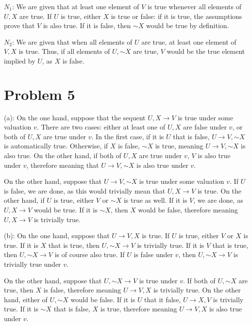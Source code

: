 \documentclass{article}
\newcommand*{\oldneg}{\mathord{\sim}}
\theoremstyle{definition}
\begin{document}
$N_1$: We are given that at least one element of $V$ is true whenever all elements of $U,X$ are true. If $U$ is true, either $X$ is true or false: if it is true, the assumptions
prove that $V$ is also true. If it is false, then $\oldneg X$ would be true by definition.


$N_2$: We are given that when all elements of $U$ are true, at least one element of $V,X$ is true. Thus, if all elements of $U,\oldneg X$ are true, $V$ would be the true element
implied by $U$, as $X$ is false.

\section*{Problem 5}


(a): On the one hand, suppose that the sequent $U,X\rightarrow V$ is true under some valuation $v$. There are two cases: either at least one of $U,X$ are false under $v$, 
or both of $U,X$ are true under $v$. In the first case, if it is $U$ that is false, $U\rightarrow V,\oldneg X$ is automatically true. Otherwise, if $X$ is false, 
$\oldneg X$ is true, meaning $U\rightarrow V,\oldneg X$ is also true. On the other hand, if both of $U,X$ are true under $v$, $V$ is also true under $v$, therefore meaning 
that $U\rightarrow V,\oldneg X$ is also true under $v$.


On the other hand, suppose that $U\rightarrow V,\oldneg X$ is true under some valuation $v$. If $U$ is false, we are done, as this would trivially mean that 
$U,X\rightarrow V$ is true. On the other hand, if $U$ is true, either $V$ or $\oldneg X$ is true as well. If it is $V$, we are done, as 
$U,X\rightarrow V$ would be true. If it is $\oldneg X$, then $X$ would be false, therefore meaning $U,X\rightarrow V$ is trivially true.


(b): On the one hand, suppose that $U\rightarrow V,X$ is true. If $U$ is true, either $V$ or $X$ is true. If it is $X$ that is true, then 
$U,\oldneg X\rightarrow V$ is trivially true. If it is $V$ that is true, then $U,\oldneg X\rightarrow V$ is of course also true. If $U$ is false under $v$, then 
$U,\oldneg X\rightarrow V$ is trivially true under $v$.


On the other hand, suppose that $U,\oldneg X\rightarrow V$ is true under $v$. If both of $U,\oldneg X$ are true, then $X$ is false, therefore meaning 
$U\rightarrow V,X$ is trivially true. On the other hand, either of $U,\oldneg X$ would be false. If it is $U$ that it false, $U\rightarrow X,V$ is trivially true. 
If it is $\oldneg X$ that is false, $X$ is true, therefore meaning $U\rightarrow V,X$ is also true under $v$.
\end{document}
